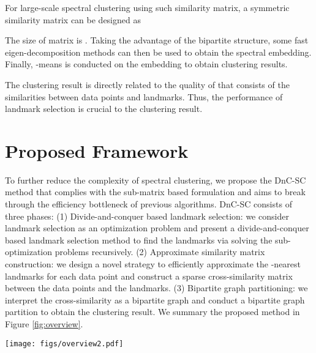 \documentclass[a4paper,fleqn]{cas-dc}
\begin{document}
For large-scale spectral clustering using such similarity matrix,
a symmetric similarity matrix  can be designed as \cite{zha2001bipartite}

The size of matrix  is . 
Taking the advantage of the bipartite structure, some fast eigen-decomposition methods \cite{fowlkes2004spectral, cai2014large, li2015superpixel} can then  be used to obtain the spectral embedding.
Finally, -means is conducted on the embedding to obtain clustering results.

The clustering result is directly related to the quality of  that consists of the similarities between data points and landmarks.
Thus, the performance of landmark selection is crucial to the clustering result.

 
\section{Proposed Framework}
\label{sec:framework}

To further reduce the complexity of spectral clustering, we propose the DnC-SC method that complies with the sub-matrix based formulation \cite{fowlkes2004spectral,cai2014large} and aims to break through the efficiency bottleneck of previous algorithms.
DnC-SC consists of three phases:
(1) Divide-and-conquer based landmark selection:
we consider landmark selection as an optimization problem and present a divide-and-conquer based landmark selection method to find the landmarks via solving the sub-optimization problems recursively.
(2) Approximate similarity matrix construction: we design a novel strategy to efficiently approximate the -nearest landmarks for each data point and construct a sparse cross-similarity matrix between the  data points and the  landmarks.
(3) Bipartite graph partitioning: we interpret the cross-similarity as a bipartite graph and conduct a bipartite graph partition to obtain the clustering result.
We summary the proposed method in Figure \ref{fig:overview}.

\begin{figure*}
    \centering
    \texttt{[image: figs/overview2.pdf]}
    \caption{An overview of proposed DnC-SC method. Given a dataset, the DnC-SC method first finds the landmarks via divide-and-conquer based landmark selection, then approximately constructs the similarity matrix, finally conducts a bipartite graph partition to obtain final clustering results.
    Our main contributions focus on the first two phases (colored as orange), i.e., the landmark selection and similarity construction phases.}
    \label{fig:overview}
\end{figure*}
\end{document}
